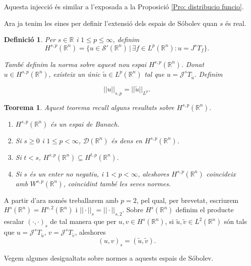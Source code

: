 \documentclass{article}
\numberwithin{equation}{section}
\newtheorem{teorema}{Teorema}[section]
\newtheorem{definicio}{Definici\'{o}}[section]
\begin{document}
Aquesta injecci\'{o} \'{e}s similar a l'exposada a la Proposici\'{o} \ref{Pro: distribucio funcio}.

Ara ja tenim les eines per definir l'extensi\'{o} dels espais de S\'{o}bolev quan $s$ \'{e}s real.

\begin{definicio}
Per $s\in\mathbb{R}$ i $1\leq p\leq\infty$, definim
\begin{equation}
H^{s,p}(\mathbb{R}^n)=\{u\in\mathcal{S}'(\mathbb{R}^n)\,|\,\exists f\in L^p(\mathbb{R}^n):u=J^sT_f\}.
\end{equation}

Tamb\'{e} definim la norma sobre aquest nou espai $H^{s,p}(\mathbb{R}^n)$. Donat $u\in H^{s,p}(\mathbb{R}^n)$, existeix un \'{u}nic $\tilde{u}\in L^p(\mathbb{R}^n)$ tal que $u=\mathcal{J}^sT_{\tilde{u}}$. Definim

\begin{equation}
||u||_{s,p}=||\tilde{u}||_{L^p}.
\end{equation}
\end{definicio}

\begin{teorema}\label{Teo: Sobolev s}
Aquest teorema recull alguns resultats sobre $H^{s,p}(\mathbb{R}^n)$.
\begin{enumerate}
\item $H^{s,p}(\mathbb{R}^n)$ \'{e}s un espai de Banach.
\item Si $s\geq0$ i $1\leq p<\infty$, $\mathcal{D}(\mathbb{R}^n)$ \'{e}s dens en $H^{s,p}(\mathbb{R}^n)$.
\item Si $t<s$, $H^{s,p}(\mathbb{R}^n)\subseteq H^{t,p}(\mathbb{R}^n)$.
\item Si $s$ \'{e}s un enter no negatiu, i $1<p<\infty$, aleshores $H^{s,p}(\mathbb{R}^n)$ coincideix amb $W^{s,p}(\mathbb{R}^n)$, coincidint tamb\'{e} les seves normes.
\end{enumerate}
\end{teorema}

A partir d'ara nom\'{e}s treballarem amb $p=2$, pel qual, per brevetat, escriurem $H^s(\mathbb{R}^n)=H^{s,2}(\mathbb{R}^n)$ i $||\cdot||_s=||\cdot||_{s,2}$. Sobre $H^s(\mathbb{R}^n)$ definim el producte escalar $(\cdot,\cdot)_s$ de tal manera que per $u,v\in H^s(\mathbb{R}^n)$, si $\tilde{u},\tilde{v}\in L^2(\mathbb{R}^n)$ s\'{o}n tals que $u=\mathcal{J}^sT_{\tilde{u}}$, $v=\mathcal{J}^sT_{\tilde{v}}$, aleshores
\[(u,v)_s=(\tilde{u},\tilde{v}).\]

Vegem algunes desigualtats sobre normes a aquests espais de S\'{o}bolev.
\end{document}
